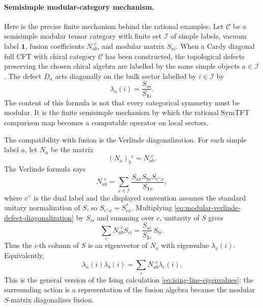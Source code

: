 \paragraph{Semisimple modular-category mechanism.}
Here is the precise finite mechanism behind the rational examples.  Let
\(\mathcal C\) be a semisimple modular tensor category with finite set
\(\mathcal I\) of simple labels, vacuum label \(\mathbf 1\), fusion
coefficients \(N_{ab}^{\ \ c}\), and modular matrix \(S_{ai}\).  When a
Cardy diagonal full CFT with chiral category \(\mathcal C\) has been
constructed, the topological defects preserving the chosen chiral algebra are
labelled by the same simple objects \(a\in\mathcal I\).  The defect \(D_a\)
acts diagonally on the bulk sector labelled by \(i\in\mathcal I\) by
\begin{equation}
  \lambda_a(i)=\frac{S_{ai}}{S_{\mathbf 1 i}} .
  \label{eq:modular-defect-eigenvalue-general}
\end{equation}
The content of this formula is not that every categorical symmetry must be
modular.  It is the finite semisimple mechanism by which the rational
SymTFT comparison map becomes a computable operator on local sectors.

The compatibility with fusion is the Verlinde diagonalization.  For each
simple label \(a\), let \(N_a\) be the matrix
\[
  (N_a)_b{}^c=N_{ab}^{\ \ c}.
\]
The Verlinde formula says
\begin{equation}
  N_{ab}^{\ \ c}
  =
  \sum_{x\in\mathcal I}
  \frac{S_{ax}S_{bx}S_{c^\vee x}}{S_{\mathbf 1 x}},
  \label{eq:modular-verlinde-defect-diagonalization}
\end{equation}
where \(c^\vee\) is the dual label and the displayed convention assumes the
standard unitary normalization of \(S\), so
\(S_{c^\vee x}=S_{cx}^\ast\).  Multiplying
\eqref{eq:modular-verlinde-defect-diagonalization} by \(S_{ci}\) and summing
over \(c\), unitarity of \(S\) gives
\begin{equation}
  \sum_c N_{ab}^{\ \ c}S_{ci}
  =
  \frac{S_{ai}}{S_{\mathbf 1 i}}\,S_{bi}.
  \label{eq:modular-n-matrix-eigenvector}
\end{equation}
Thus the \(i\)-th column of \(S\) is an eigenvector of \(N_a\) with
eigenvalue \(\lambda_a(i)\).  Equivalently,
\begin{equation}
  \lambda_a(i)\lambda_b(i)
  =
  \sum_c N_{ab}^{\ \ c}\lambda_c(i).
  \label{eq:modular-defect-eigenvalues-fusion-representation}
\end{equation}
This is the general version of the Ising calculation
\eqref{eq:ising-line-eigenvalues}: the surrounding action is a representation
of the fusion algebra because the modular \(S\)-matrix diagonalizes fusion.

